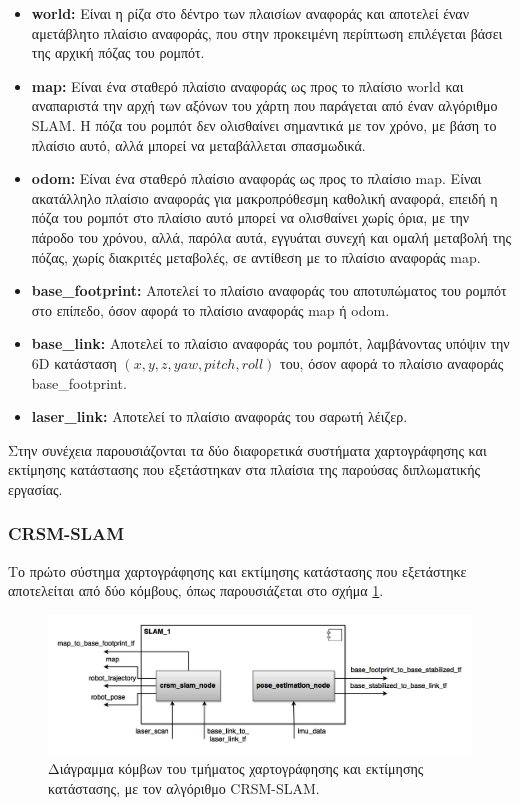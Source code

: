 \begin{itemize}
	\item \textbf{world:} Είναι η ρίζα στο δέντρο των πλαισίων αναφοράς και αποτελεί έναν αμετάβλητο πλαίσιο αναφοράς, που στην προκειμένη περίπτωση επιλέγεται βάσει της αρχική πόζας του ρομπότ.
	\item \textbf{map:} Είναι ένα σταθερό πλαίσιο αναφοράς ως προς το πλαίσιο world και αναπαριστά την αρχή των αξόνων του χάρτη που παράγεται από έναν αλγόριθμο SLAM. Η πόζα του ρομπότ δεν ολισθαίνει σημαντικά με τον χρόνο, με βάση το πλαίσιο αυτό, αλλά μπορεί να μεταβάλλεται σπασμωδικά.
	\item \textbf{odom:} Είναι ένα σταθερό πλαίσιο αναφοράς ως προς το πλαίσιο map. Είναι ακατάλληλο πλαίσιο αναφοράς για μακροπρόθεσμη καθολική αναφορά, επειδή η πόζα του ρομπότ στο πλαίσιο αυτό μπορεί να ολισθαίνει χωρίς όρια, με την πάροδο του χρόνου, αλλά, παρόλα αυτά, εγγυάται συνεχή και ομαλή μεταβολή της πόζας, χωρίς διακριτές μεταβολές, σε αντίθεση με το πλαίσιο αναφοράς map.
	\item \textbf{base{\_}footprint:} Αποτελεί το πλαίσιο αναφοράς του αποτυπώματος του ρομπότ στο επίπεδο, όσον αφορά το πλαίσιο αναφοράς map ή odom.
	\item \textbf{base{\_}link:} Αποτελεί το πλαίσιο αναφοράς του ρομπότ, λαμβάνοντας υπόψιν την 6D κατάσταση $(x,y,z,yaw,pitch,roll)$ του, όσον αφορά το πλαίσιο αναφοράς base{\_}footprint.
	\item \textbf{laser{\_}link:} Αποτελεί το πλαίσιο αναφοράς του σαρωτή λέιζερ.
\end{itemize}

\bigskip Στην συνέχεια παρουσιάζονται τα δύο διαφορετικά συστήματα χαρτογράφησης και εκτίμησης κατάστασης που εξετάστηκαν στα πλαίσια της παρούσας διπλωματικής εργασίας.

\subsubsection{CRSM-SLAM}
Το πρώτο σύστημα χαρτογράφησης και εκτίμησης κατάστασης που εξετάστηκε αποτελείται από δύο κόμβους, όπως παρουσιάζεται στο σχήμα \ref{fig:slam_1_component_diagram}.

\begin{figure}[!ht]
	\centering
	\includegraphics[width=\linewidth]{Chapters/Chapter4/Figures/slam_1_component_diagram.png}
	\caption{Διάγραμμα κόμβων του τμήματος χαρτογράφησης και εκτίμησης κατάστασης, με τον αλγόριθμο CRSM-SLAM.}
	\label{fig:slam_1_component_diagram}
\end{figure}

